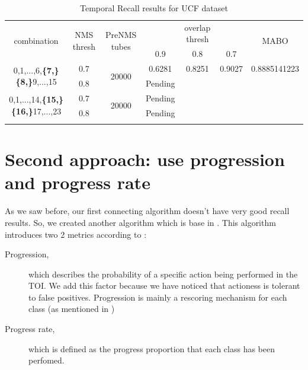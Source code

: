 \documentclass{report}
\begin{document}
\begin{center}
  \setlength{\tabcolsep}{2.2pt}
\begin{longtable}{||c | c | c ||c c c| c|}

  \hline
  \multirow{2}{*}{combination} & \multirow{2}{2.5em}{NMS thresh} & \multirow{2}{3.5em}{PreNMS tubes} &  {} &overlap thresh & {} & \multirow{2}{*}{MABO} \\
  {} & {} & {} &  0.9 &  0.8 & 0.7 & {}\\         
  \hline
  \multirow{2}{7em}{0,1,...,6,\textbf{\{7,\}}
  \textbf{\{8,\}}9,...,15 }  & 0.7 &\multirow{2}{*}{20000}  & 0.6281 & 0.8251 & 0.9027 & 0.8885141223  \\
  \cline{2-2} \cline{4-7} 
  {} &  0.8   & {}   & Pending \\
  \hline                                    
  \multirow{2}{7em}{0,1,...,14,\textbf{\{15,\}}
  \textbf{\{16,\}}17,...,23 }  & 0.7 & \multirow{2}{*}{20000}   & Pending \\
  \cline{2-2} \cline{4-7} 
                                    {} &  0.8   & {}   & Pending \\
  \hline                                    

  \caption{Temporal Recall results for UCF dataset}
  \label{table:ucf_nms_temp_recall}
\end{longtable} 
\end{center}


\section{Second approach: use progression and progress rate}
As we saw before, our first connecting algorithm doesn't have very good recall results. So, we created another algorithm which is base in \cite{DBLP:journals/corr/abs-1903-00304}. This
algorithm introduces two 2 metrics according to \cite{DBLP:journals/corr/abs-1903-00304}:

\begin{description}
\item[ Progression,  ] which describes the probability of a specific action being performed in the TOI. 
  We add this factor because we have noticed that actioness is tolerant to false positives. Progression is
  mainly a rescoring mechanism for each class (as mentioned in \cite{DBLP:journals/corr/abs-1903-00304})

\item [ Progress rate, ] which is defined as the progress proportion that each class has been perfomed.
  
\end{description}
\end{document}
